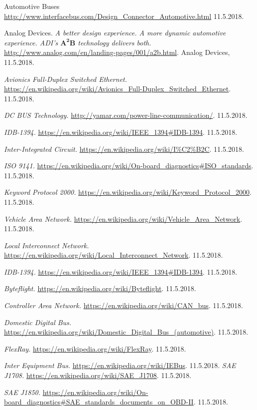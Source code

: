 \documentclass[a4paper]{article}
\begin{document}
\begin{thebibliography}{20}

Automotive Buses
\url{http://www.interfacebus.com/Design_Connector_Automotive.html}
11.5.2018.

Analog Devices.
\textit{A better design experience. A more dynamic automotive experience. ADI's $\mathbf{A^{2}B}$ technology delivers both.}
\url{http://www.analog.com/en/landing-pages/001/a2b.html}. 
Analog Devices, 11.5.2018.
 
\textit{Avionics Full-Duplex Switched Ethernet.}
\url{https://en.wikipedia.org/wiki/Avionics_Full-Duplex_Switched_Ethernet}. 
11.5.2018.
 
\textit{DC BUS Technology.}
\url{http://yamar.com/power-line-communication/}.
11.5.2018.

\textit{IDB-1394.}
\url{https://en.wikipedia.org/wiki/IEEE_1394#IDB-1394}.
11.5.2018.

\textit{Inter-Integrated Circuit.}
\url{https://en.wikipedia.org/wiki/I\%C2\%B2C}.
11.5.2018.

\textit{ISO 9141.}
\url{https://en.wikipedia.org/wiki/On-board_diagnostics#ISO_standards}.
11.5.2018.

\textit{Keyword Protocol 2000.}
\url{https://en.wikipedia.org/wiki/Keyword_Protocol_2000}.
11.5.2018.

\textit{Vehicle Area Network.}
\url{https://en.wikipedia.org/wiki/Vehicle_Area_Network}.
11.5.2018.

\textit{Local Interconnect Network.}
\url{https://en.wikipedia.org/wiki/Local_Interconnect_Network}.
11.5.2018.

\textit{IDB-1394.}
\url{https://en.wikipedia.org/wiki/IEEE_1394#IDB-1394}.
11.5.2018.

\textit{Byteflight.}
\url{https://en.wikipedia.org/wiki/Byteflight}.
11.5.2018.
 
\textit{Controller Area Network.}
\url{https://en.wikipedia.org/wiki/CAN_bus}.
11.5.2018.

\textit{Domestic Digital Bus.}
\url{https://en.wikipedia.org/wiki/Domestic_Digital_Bus_(automotive)}.
11.5.2018.

\textit{FlexRay.}
\url{https://en.wikipedia.org/wiki/FlexRay}.
11.5.2018.

\textit{Inter Equipment Bus.}
\url{https://en.wikipedia.org/wiki/IEBus}.
11.5.2018.
\textit{SAE J1708.}
\url{https://en.wikipedia.org/wiki/SAE_J1708}.
11.5.2018.

\textit{SAE J1850.}
\url{https://en.wikipedia.org/wiki/On-board_diagnostics#SAE_standards_documents_on_OBD-II}.
11.5.2018.



\end{thebibliography}
\end{document}
